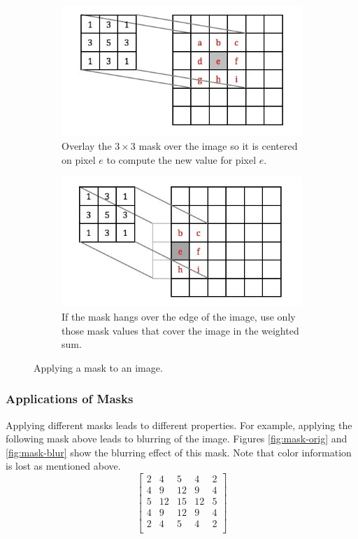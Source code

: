 \documentclass[addpoints]{exam}
\begin{document}
\begin{figure}
  \centering
  \begin{subfigure}{.48\textwidth}
    \includegraphics[width=\textwidth]{mask1}
    \caption{Overlay the $3 \times 3$ mask over the image so it is centered on pixel $e$ to compute the new value for pixel $e$.}\label{fig:mask-full}
  \end{subfigure}
  \begin{subfigure}[c]{.48\textwidth}
    \includegraphics[width=\textwidth]{mask2}
    \caption{If the mask hangs over the edge of the image, use only those mask values that cover the image in the weighted sum.}\label{fig:mask-hang}
  \end{subfigure}
  \caption{Applying a mask to an image.}
  \label{fig:mask}
\end{figure}

\subsubsection{Applications of Masks}

Applying different masks leads to different properties. For example, applying the following mask above leads to blurring of the image. Figures \ref{fig:mask-orig} and \ref{fig:mask-blur} show the blurring effect of this mask. Note that color information is lost as mentioned above.
\[
  \left[
    \begin{array}{ccccc}
      2 & 4 & 5 & 4 & 2\\
      4 & 9 & 12 & 9 & 4\\
      5 & 12 & 15 & 12 & 5\\
      4 & 9 & 12 & 9 & 4\\
      2 & 4 & 5 & 4 & 2\\
    \end{array}          
  \right]
\]
\end{document}
